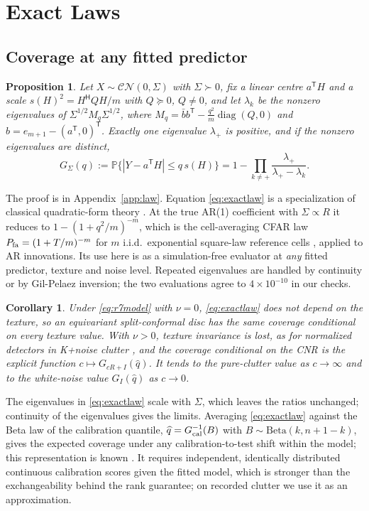 \documentclass[journal]{IEEEtran}
\newtheorem{proposition}{Proposition}
\newtheorem{corollary}{Corollary}
\newcommand{\PP}{\mathbb{P}}
\begin{document}
\section{Exact Laws}
\subsection{Coverage at any fitted predictor}
\begin{proposition}\label{prop:law}
Let $X\sim\mathcal{CN}(0,\Sigma)$ with $\Sigma\succ0$, fix a linear centre $a^{\mathsf T}H$ and a scale $s(H)^2=H^{\mathsf H}QH/m$ with $Q\succeq0$, $Q\ne0$, and let $\lambda_k$ be the nonzero eigenvalues of $\Sigma^{1/2}M_q\Sigma^{1/2}$, where $M_q=\bar bb^{\mathsf T}-\frac{q^2}{m}\operatorname{diag}(Q,0)$ and $b=e_{m+1}-(a^{\mathsf T},0)^{\mathsf T}$. Exactly one eigenvalue $\lambda_+$ is positive, and if the nonzero eigenvalues are distinct,
\begin{equation}
G_\Sigma(q):=\PP\{|Y-a^{\mathsf T}H|\le q\,s(H)\}=1-\prod_{k\ne+}\frac{\lambda_+}{\lambda_+-\lambda_k}.
\label{eq:exactlaw}
\end{equation}
\end{proposition}
The proof is in Appendix~\ref{app:law}. Equation \eqref{eq:exactlaw} is a specialization of classical quadratic-form theory \cite{imhof1961,alnaffouri2016}. At the true AR(1) coefficient with $\Sigma\propto R$ it reduces to $1-(1+q^2/m)^{-m}$, which is the cell-averaging CFAR law $P_{\rm fa}=(1+T/m)^{-m}$ for $m$ i.i.d.\ exponential square-law reference cells \cite{finn1968,gandhi1988}, applied to AR innovations. Its use here is as a simulation-free evaluator at \emph{any} fitted predictor, texture and noise level. Repeated eigenvalues are handled by continuity or by Gil-Pelaez inversion; the two evaluations agree to $4\times10^{-10}$ in our checks.

\begin{corollary}\label{cor:texture}
Under \eqref{eq:r7model} with $\nu=0$, \eqref{eq:exactlaw} does not depend on the texture, so an equivariant split-conformal disc has the same coverage conditional on every texture value. With $\nu>0$, texture invariance is lost, as for normalized detectors in K+noise clutter \cite{gini1997,watts1987,sangston2012}, and the coverage conditional on the CNR is the explicit function $c\mapsto G_{cR+I}(\widehat q)$. It tends to the pure-clutter value as $c\to\infty$ and to the white-noise value $G_I(\widehat q)$ as $c\to0$.
\end{corollary}
The eigenvalues in \eqref{eq:exactlaw} scale with $\Sigma$, which leaves the ratios unchanged; continuity of the eigenvalues gives the limits. Averaging \eqref{eq:exactlaw} against the Beta law of the calibration quantile, $\widehat q=G_{\rm cal}^{-1}(B)$ with $B\sim\mathrm{Beta}(k,n+1-k)$, gives the expected coverage under any calibration-to-test shift within the model; this representation is known \cite{vovk2012,ramos2026}. It requires independent, identically distributed continuous calibration scores given the fitted model, which is stronger than the exchangeability behind the rank guarantee; on recorded clutter we use it as an approximation.
\end{document}
